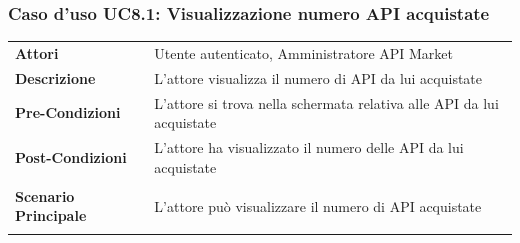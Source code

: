 \subsubsection{Caso d'uso UC8.1: Visualizzazione numero API acquistate}
\label{UC8_1}

\begin{minipage}{\linewidth}
	\begin{tabular}{ l | p{11cm}}
		\hline
		\rowcolor{Gray}
		\multicolumn{2}{c}{UC8.1 - Visualizzazione numero API acquistate} \\
		\hline
		\textbf{Attori} & Utente autenticato, Amministratore API Market \\
		\textbf{Descrizione} & L'attore visualizza il numero di API da lui acquistate \\
		\textbf{Pre-Condizioni} & L'attore si trova nella schermata relativa alle API da lui acquistate \\
		\textbf{Post-Condizioni} & L'attore ha visualizzato il numero delle API da lui acquistate \\
		\textbf{Scenario Principale} & 
		\begin{enumerate*}[label=(\arabic*.),itemjoin={\newline}]
			\item L'attore può visualizzare il numero di API acquistate
		\end{enumerate*}\\
	\end{tabular}
\end{minipage}

\newpage
